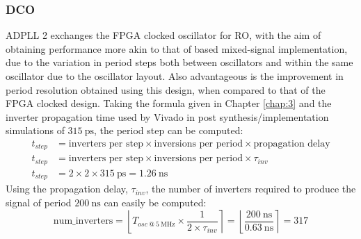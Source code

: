 \subsubsection{\acl{DCO}}
\ac{ADPLL} 2 exchanges the \ac{FPGA} clocked oscillator for \ac{RO}, with the aim of obtaining performance more akin to that of  based mixed-signal implementation, due to the variation in period steps both between oscillators and within the same oscillator due to the oscillator layout. Also advantageous is the improvement in period resolution obtained using this design, when compared to that of the \ac{FPGA} clocked design. Taking the formula given in Chapter \ref{chap:3} and the inverter propagation time used by Vivado in post synthesis/implementation simulations of $315~\si{\pico\second}$, the period step can be computed:
\begin{align}
t_{step} &= \text{inverters per step}\times\text{inversions per period}\times\text{propagation delay} \\
t_{step} &= \text{inverters per step}\times\text{inversions per period}\times\tau_{inv} \\
t_{step} &= 2\times 2\times 315~\si{\pico\second} = 1.26~\si{\nano\second}
\end{align}
Using the propagation delay, $\tau_{inv}$, the number of inverters required to produce the signal of period $200~\si{\nano\second}$ can easily be computed:
\begin{equation}
\text{num\_inverters} = \left \lfloor{ T_{osc~@~5~\si{\mega\hertz}}\times \frac{1}{2\times\tau_{inv}}}\right \rceil = \left \lfloor{ \frac{200~\si{\nano\second}}{0.63~\si{\nano\second}}}\right \rceil = 317
\end{equation}

